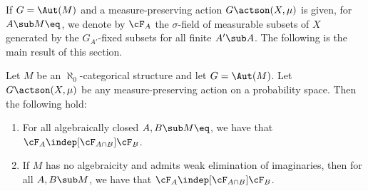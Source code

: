 If $G = \Aut(M)$ and a measure-preserving action $G \actson (X, \mu)$ is given, for $A \sub M\eq$, we denote by $\cF_A$ the $\sigma$-field of measurable subsets of $X$ generated by the $G_{A'}$-fixed subsets for all finite $A' \sub A$. The following is the main result of this section.
\begin{theorem}
\label{th:general-independence}
Let $M$ be an $\aleph_0$-categorical structure and let $G = \Aut(M)$. Let $G \actson\nobreak (X, \mu)$ be any measure-preserving action on a probability space. Then the following hold:
\begin{enumerate}
\item \label{i:thgen:1} For all algebraically closed $A, B \sub M\eq$, we have that $\cF_A \indep[\cF_{A \cap B}] \cF_B$.

\item \label{i:thgen:2} If $M$ has no algebraicity and admits weak elimination of imaginaries, then for all $A, B \sub M$, we have that $\cF_A \indep[\cF_{A \cap B}] \cF_B$.
\end{enumerate}
\end{theorem}

